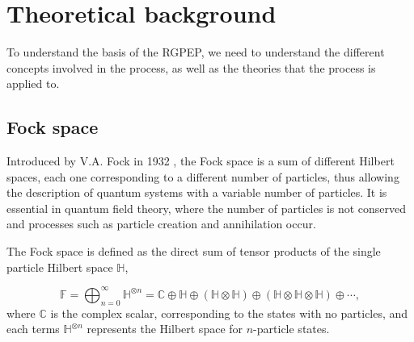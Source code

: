 \documentclass[11pt,a4paper,twoside,pdf]{article}
\numberwithin{equation}{section}
\begin{document}
\section{Theoretical background} \label{sec:theoretical_background}

To understand the basis of the RGPEP, we need to understand the different
concepts involved in the process, as well as the theories that the process is
applied to.  

\subsection{Fock space} \label{sec:fock_space}

Introduced by V.A. Fock in 1932 \cite{1932ZPhy...75..622F}, the Fock space is a sum 
of different Hilbert spaces, each one corresponding to a different number of particles, 
thus allowing the description of quantum systems with a variable number of particles. 
It is essential in quantum field theory, where the number of particles is not conserved 
and processes such as particle creation and annihilation occur.

The Fock space is defined as the direct sum of tensor products of the single 
particle Hilbert space $\mathbb{H}$,

\begin{equation}
    \mathbb{F} = \bigoplus_{n=0}^{\infty}  \mathbb{H}^{\otimes n} = 
    \mathbb{C} \oplus \mathbb{H} \oplus (\mathbb{H} \otimes \mathbb{H}) 
    \oplus (\mathbb{H} \otimes \mathbb{H}\otimes \mathbb{H}) \oplus \cdots,
\end{equation}
where $\mathbb{C}$ is the complex scalar, corresponding to the states with no particles,
and each terms \( \mathbb{H}^{\otimes n} \) represents the Hilbert space for 
\( n \)-particle states.
\end{document}

